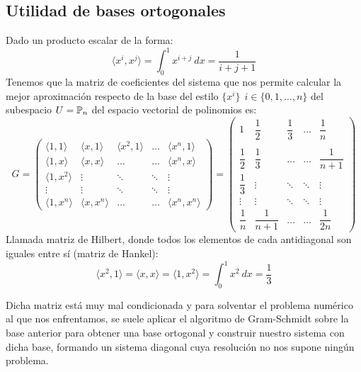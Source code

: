 \subsection{Utilidad de bases ortogonales}
\noindent
Dado un producto escalar de la forma:
$$\langle x^i, x^j \rangle = \int_0^1 x^{i+j}~dx = \dfrac{1}{i+j+1}$$
Tenemos que la matriz de coeficientes del sistema que nos permite calcular la mejor aproximación respecto de la base
del estilo $\{x^i\}~~i \in \{0, 1, \ldots, n\}$ del subespacio $U=\mathbb{P}_n$ del espacio vectorial de polinomios es:
$$G=\left(\begin{array}{ccccc}
            \langle 1,1 \rangle   & \langle x,1 \rangle   & \langle x^2,1 \rangle & \ldots & \langle x^n,1 \rangle   \\
            \langle 1,x \rangle   & \langle x,x \rangle   & \ldots                & \ldots & \langle x^n, x \rangle  \\
            \langle 1,x^2 \rangle & \vdots                & \ddots                & \ddots & \vdots                  \\
            \vdots                & \vdots                & \ddots                & \ddots & \vdots                  \\
            \langle 1,x^n \rangle & \langle x,x^n \rangle & \ldots                & \ldots & \langle x^n,x^n \rangle
        \end{array}\right) = \left( \begin{array}{ccccc}
            1            & \dfrac{1}{2}   & \dfrac{1}{3} & \ldots & \dfrac{1}{n}   \\
                         &                &              &                         \\
            \dfrac{1}{2} & \dfrac{1}{3}   & \ldots       & \ldots & \dfrac{1}{n+1} \\
            \dfrac{1}{3} & \vdots         & \ddots       & \ddots & \vdots         \\
            \vdots       & \vdots         & \ddots       & \ddots & \vdots         \\
            \dfrac{1}{n} & \dfrac{1}{n+1} & \ldots       & \ldots & \dfrac{1}{2n}
        \end{array} \right)$$
Llamada matriz de Hilbert, donde todos los elementos de cada antidiagonal son iguales entre sí (matriz de Hankel):
$$\langle x^2,1 \rangle = \langle x,x \rangle = \langle 1,x^2 \rangle = \int_0^1 x^2~dx = \dfrac{1}{3}$$

\noindent
Dicha matriz está muy mal condicionada y para solventar el problema numérico al que nos enfrentamos, se suele aplicar
el algoritmo de Gram-Schmidt sobre la base anterior para obtener una base ortogonal y construir nuestro sistema
con dicha base, formando un sistema diagonal cuya resolución no nos supone ningún problema.\\

